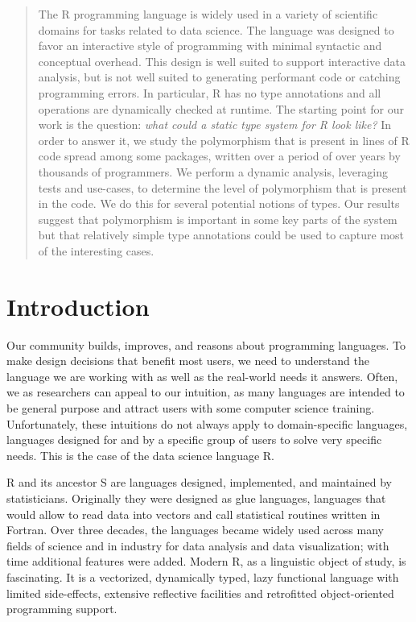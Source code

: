 \documentclass[acmsmall,10pt,review,anonymous]{acmart}\settopmatter{printfolios=true,printccs=false,printacmref=false}
\begin{document}
\begin{abstract}
The R programming language is widely used in a variety of scientific domains
for tasks related to data science. The language was designed to favor an
interactive style of programming with minimal syntactic and conceptual
overhead. This design is well suited to support interactive data analysis,
but is not well suited to generating performant code or catching programming
errors.  In particular, R has no type annotations and all operations are
dynamically checked at runtime. The starting point for our work is the
question: \emph{what could a static type system for R look like?}  In order to answer
it, we study the polymorphism that is present in \RLOC lines of R
code spread among some \PACKAGES packages, written over a
period of over \YEARS years by thousands of programmers.  We perform a dynamic
analysis, leveraging tests and use-cases, to determine the level of
polymorphism that is present in the code. We do this for several potential
notions of types. Our results suggest that polymorphism is important in some
key parts of the system but that relatively simple type annotations could be
used to capture most of the interesting cases.

\end{abstract}

\maketitle

\section{Introduction}

Our community builds, improves, and reasons about programming languages.  To
make design decisions that benefit most users, we need to understand the
language we are working with as well as the real-world needs it
answers. Often, we as researchers can appeal to our intuition, as many
languages are intended to be general purpose and attract users with some
computer science training. Unfortunately, these intuitions do not always
apply to domain-specific languages, languages designed for and by a specific
group of users to solve very specific needs. This is the case of the data
science language R.

R and its ancestor S are languages designed, implemented, and maintained by
statisticians. Originally they were designed as glue languages, languages
that would allow to read data into vectors and call statistical routines
written in Fortran. Over three decades, the languages became widely used
across many fields of science and in industry for data analysis and data
visualization; with time additional features were added.  Modern R, as a
linguistic object of study, is fascinating. It is a vectorized, dynamically
typed, lazy functional language with limited side-effects, extensive
reflective facilities and retrofitted object-oriented programming support.
\end{document}
